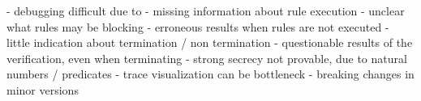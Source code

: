 - debugging difficult due to
    - missing information about rule execution
    - unclear what rules may be blocking
    - erroneous results when rules are not executed
    - little indication about termination / non termination
- questionable results of the verification, even when terminating
- strong secrecy not provable, due to natural numbers / predicates
- trace visualization can be bottleneck
- breaking changes in minor versions
